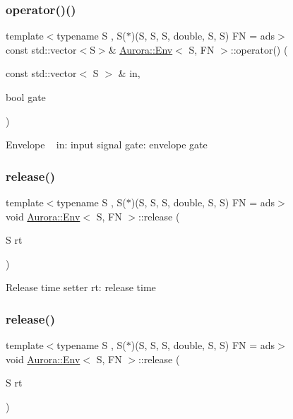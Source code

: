 \subsubsection{\texorpdfstring{operator()()}{operator()()}\hspace{0.1cm}{\footnotesize\ttfamily [6/6]}}
{\footnotesize\ttfamily template$<$typename S , S($\ast$)(\+S, S, S, double, S, S) FN = ads$>$ \\
const std\+::vector$<$S$>$\& \hyperlink{class_aurora_1_1_env}{Aurora\+::\+Env}$<$ S, FN $>$\+::operator() (\begin{DoxyParamCaption}\item[{const std\+::vector$<$ S $>$ \&}]{in,  }\item[{bool}]{gate }\end{DoxyParamCaption})\hspace{0.3cm}{\ttfamily [inline]}}

Envelope ~\newline
in\+: input signal gate\+: envelope gate \mbox{\label{class_aurora_1_1_env_a2e52ca727b587d89e13a6c3832786f22}} 
\subsubsection{\texorpdfstring{release()}{release()}\hspace{0.1cm}{\footnotesize\ttfamily [1/2]}}
{\footnotesize\ttfamily template$<$typename S , S($\ast$)(\+S, S, S, double, S, S) FN = ads$>$ \\
void \hyperlink{class_aurora_1_1_env}{Aurora\+::\+Env}$<$ S, FN $>$\+::release (\begin{DoxyParamCaption}\item[{S}]{rt }\end{DoxyParamCaption})\hspace{0.3cm}{\ttfamily [inline]}}

Release time setter rt\+: release time \mbox{\label{class_aurora_1_1_env_a2e52ca727b587d89e13a6c3832786f22}} 
\subsubsection{\texorpdfstring{release()}{release()}\hspace{0.1cm}{\footnotesize\ttfamily [2/2]}}
{\footnotesize\ttfamily template$<$typename S , S($\ast$)(\+S, S, S, double, S, S) FN = ads$>$ \\
void \hyperlink{class_aurora_1_1_env}{Aurora\+::\+Env}$<$ S, FN $>$\+::release (\begin{DoxyParamCaption}\item[{S}]{rt }\end{DoxyParamCaption})\hspace{0.3cm}{\ttfamily [inline]}}

